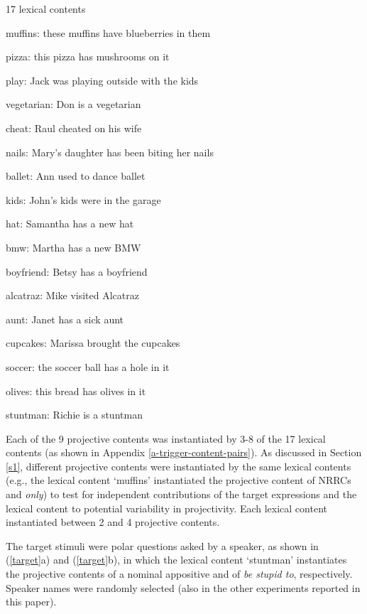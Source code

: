 \documentclass[11pt,fleqn]{article}
\newcommand{\6}{\mbox{$[\hspace*{-.6mm}[$}}
\newcommand{\9}{\mbox{$]\hspace*{-.6mm}]$}}
\newcommand{\sectionref}[1]{Section \ref{#1}}
\begin{document}
\begin{exe}
\ex\label{contents} 17 lexical contents

\begin{enumerate}[itemsep=-.5mm]

\ex muffins: these muffins have blueberries in them

\ex pizza: this pizza has mushrooms on it

\ex play: Jack was playing outside with the kids

\ex vegetarian: Don is a vegetarian

\ex cheat: Raul cheated on his wife

\ex nails: Mary's daughter has been biting her nails

\ex ballet: Ann used to dance ballet

\ex kids: John's kids were in the garage

\ex hat: Samantha has a new hat

\ex bmw: Martha has a new BMW

\ex boyfriend: Betsy has a boyfriend

\ex alcatraz: Mike visited Alcatraz

\ex aunt: Janet has a sick aunt

\ex cupcakes: Marissa brought the cupcakes

\ex soccer: the soccer ball has a hole in it

\ex olives: this bread has olives in it

\ex stuntman: Richie is a stuntman

\end{enumerate}
\end{exe}

Each of the 9 projective contents was instantiated by 3-8 of the 17 lexical contents (as shown in Appendix \ref{a-trigger-content-pairs}). As discussed in \sectionref{s1}, different projective contents were instantiated by the same lexical contents (e.g., the lexical content `muffins' instantiated the projective content of NRRCs and {\em only}) to test for independent contributions of the target expressions and the lexical content to potential variability in projectivity. Each lexical content instantiated between 2 and 4 projective contents.

The target stimuli were polar questions asked by a speaker, as shown in (\ref{target}a) and (\ref{target}b), in which the lexical content `stuntman' instantiates the projective contents of a nominal appositive and of {\em be stupid to}, respectively. Speaker names were randomly selected (also in the other experiments reported in this paper).
\end{document}
